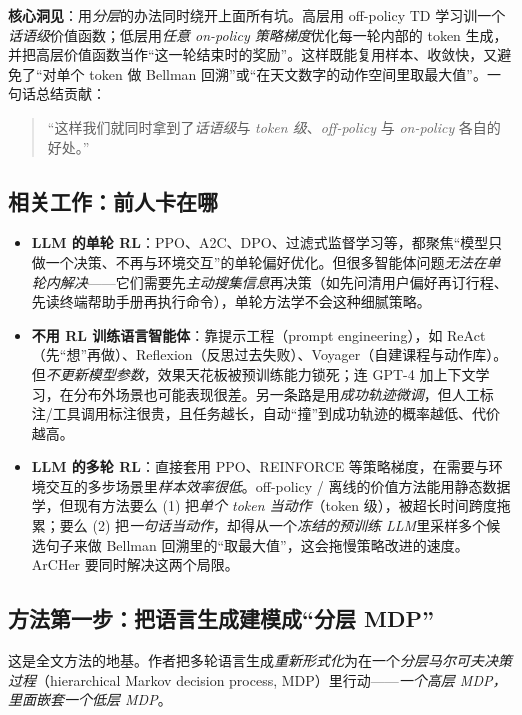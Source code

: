 \documentclass[11pt,UTF8,fontset=fandol]{ctexart}
\begin{document}
\textbf{核心洞见}：用\emph{分层}的办法同时绕开上面所有坑。高层用 off-policy TD 学习训一个\emph{话语级}价值函数；低层用\emph{任意 on-policy 策略梯度}优化每一轮内部的 token 生成，并把高层价值函数当作“这一轮结束时的奖励”。这样既能复用样本、收敛快，又避免了“对单个 token 做 Bellman 回溯”或“在天文数字的动作空间里取最大值”。一句话总结贡献：

\begin{quote}
“这样我们就同时拿到了\emph{话语级}与 \emph{token 级}、\emph{off-policy} 与 \emph{on-policy} 各自的好处。”
\end{quote}

\subsection{相关工作：前人卡在哪}

\begin{itemize}[leftmargin=1.5em]
\item \textbf{LLM 的单轮 RL}：PPO、A2C、DPO、过滤式监督学习等，都聚焦“模型只做一个决策、不再与环境交互”的单轮偏好优化。但很多智能体问题\emph{无法在单轮内解决}——它们需要先\emph{主动搜集信息}再决策（如先问清用户偏好再订行程、先读终端帮助手册再执行命令），单轮方法学不会这种细腻策略。
\item \textbf{不用 RL 训练语言智能体}：靠提示工程（prompt engineering），如 ReAct（先“想”再做）、Reflexion（反思过去失败）、Voyager（自建课程与动作库）。但\emph{不更新模型参数}，效果天花板被预训练能力锁死；连 GPT-4 加上下文学习，在分布外场景也可能表现很差。另一条路是用\emph{成功轨迹微调}，但人工标注/工具调用标注很贵，且任务越长，自动“撞”到成功轨迹的概率越低、代价越高。
\item \textbf{LLM 的多轮 RL}：直接套用 PPO、REINFORCE 等策略梯度，在需要与环境交互的多步场景里\emph{样本效率很低}。off-policy / 离线的价值方法能用静态数据学，但现有方法要么 (1) 把\emph{单个 token 当动作}（token 级），被超长时间跨度拖累；要么 (2) 把\emph{一句话当动作}，却得从一个\emph{冻结的预训练 LLM}里采样多个候选句子来做 Bellman 回溯里的“取最大值”，这会拖慢策略改进的速度。ArCHer 要同时解决这两个局限。
\end{itemize}

\subsection{方法第一步：把语言生成建模成“分层 MDP”}

这是全文方法的地基。作者把多轮语言生成\emph{重新形式化}为在一个\emph{分层马尔可夫决策过程}（hierarchical Markov decision process, MDP）里行动——\emph{一个高层 MDP，里面嵌套一个低层 MDP}。
\end{document}
